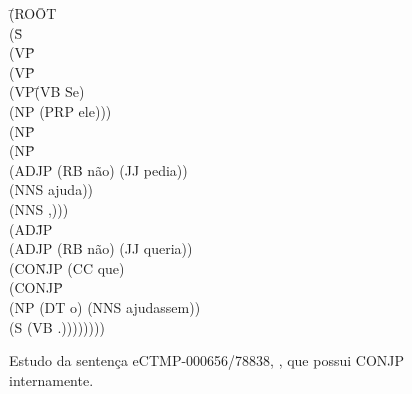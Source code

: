 \begin{figure}[!ht]
\begin{minipage}{.55\textwidth}
\begin{tabbing}
            \=(RO\=OT\+\\
            \>  (S\=\+\\
            \>    (VP\=\+\\
            \>      (VP\=\+\\
            \>        (VP\= (VB Se)\+\\
            \>          (NP (PRP ele)))\-\-\\
            \>        (NP\=\+\\
            \>          (NP\=\+\\
            \>            (ADJP (RB não) (JJ pedia))\\
            \>            (NNS ajuda))\-\\
            \>          (NNS ,)))\-\\
            \>      (AD\=JP\+\\
            \>        (ADJP (RB não) (JJ queria))\\
            \>        (CO\=NJP (CC que)\+\\
            \>          (CONJP\=\+\\
            \>            (NP (DT o) (NNS ajudassem))\\
            \>            (S (VB .))))))))
            \end{tabbing}
    \end{minipage}
    \caption[Estudo de caso CINTIL - Sentença transduzida com CONJP]{Estudo da sentença eCTMP-000656/78838, , que possui CONJP internamente.}
    \label{fig:ec_cintil_conjp_bracketing}
\end{figure}